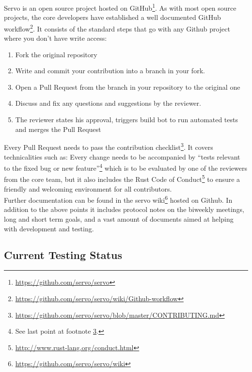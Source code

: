 \documentclass{scrartcl}
\begin{document}
Servo is an open source project hosted on GitHub\footnote{\url{https://github.com/servo/servo}}. As with most open source projects, the core developers have established a well documented GitHub workflow\footnote{\url{https://github.com/servo/servo/wiki/Github-workflow}}. It consists of the standard steps that go with any Github project where you don't have write access:
\begin{enumerate}
    \item Fork the original repository
    \item Write and commit your contribution into a branch in your fork.
    \item Open a Pull Request from the branch in your repository to the original one
    \item Discuss and fix any questions and suggestions by the reviewer.
    \item The reviewer states his approval, triggers build bot to run automated tests and merges the Pull Request
\end{enumerate}

Every Pull Request needs to pass the contribution checklist\footnote{\label{contributing}\url{https://github.com/servo/servo/blob/master/CONTRIBUTING.md}}. It covers technicalities such as: Every change needs to be accompanied by ``tests relevant to the fixed bug or new feature''\footnote{See last point at footnote \ref{contributing}.} which is to be evaluated by one of the reviewers from the core team, but it also includes the Rust Code of Conduct\footnote{\url{http://www.rust-lang.org/conduct.html}} to ensure a friendly and welcoming environment for all contributors.  \\

Further documentation can be found in the servo wiki\footnote{\url{https://github.com/servo/servo/wiki}} hosted on Github. In addition to the above points it includes protocol notes on the biweekly meetings, long and short term goals, and a vast amount of documents aimed at helping with development and testing.


\subsection{Current Testing Status} \label{test_status}
\end{document}
